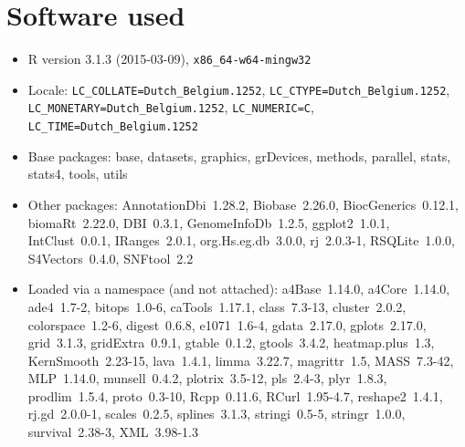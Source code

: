 \documentclass[a4paper]{article}
\begin{document}
\section{Software used}
\begin{itemize}\raggedright
  \item R version 3.1.3 (2015-03-09), \verb|x86_64-w64-mingw32|
  \item Locale: \verb|LC_COLLATE=Dutch_Belgium.1252|, \verb|LC_CTYPE=Dutch_Belgium.1252|, \verb|LC_MONETARY=Dutch_Belgium.1252|, \verb|LC_NUMERIC=C|, \verb|LC_TIME=Dutch_Belgium.1252|
  \item Base packages: base, datasets,
    graphics, grDevices, methods, parallel,
    stats, stats4, tools, utils
  \item Other packages:
    AnnotationDbi~1.28.2, Biobase~2.26.0,
    BiocGenerics~0.12.1, biomaRt~2.22.0,
    DBI~0.3.1, GenomeInfoDb~1.2.5,
    ggplot2~1.0.1, IntClust~0.0.1,
    IRanges~2.0.1, org.Hs.eg.db~3.0.0,
    rj~2.0.3-1, RSQLite~1.0.0,
    S4Vectors~0.4.0, SNFtool~2.2
  \item Loaded via a namespace (and not
    attached): a4Base~1.14.0, a4Core~1.14.0,
    ade4~1.7-2, bitops~1.0-6,
    caTools~1.17.1, class~7.3-13,
    cluster~2.0.2, colorspace~1.2-6,
    digest~0.6.8, e1071~1.6-4, gdata~2.17.0,
    gplots~2.17.0, grid~3.1.3,
    gridExtra~0.9.1, gtable~0.1.2,
    gtools~3.4.2, heatmap.plus~1.3,
    KernSmooth~2.23-15, lava~1.4.1,
    limma~3.22.7, magrittr~1.5, MASS~7.3-42,
    MLP~1.14.0, munsell~0.4.2,
    plotrix~3.5-12, pls~2.4-3, plyr~1.8.3,
    prodlim~1.5.4, proto~0.3-10,
    Rcpp~0.11.6, RCurl~1.95-4.7,
    reshape2~1.4.1, rj.gd~2.0.0-1,
    scales~0.2.5, splines~3.1.3,
    stringi~0.5-5, stringr~1.0.0,
    survival~2.38-3, XML~3.98-1.3
\end{itemize}
\end{document}
